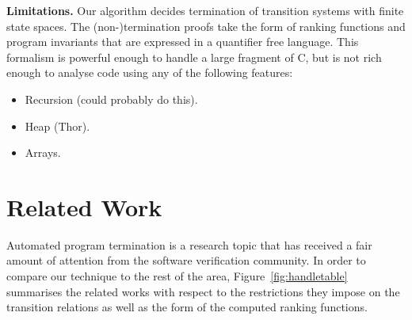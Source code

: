 \documentclass[preprint]{sigplanconf}
\theoremstyle{definition}
\begin{document}





{\bf Limitations.}
Our algorithm decides termination of transition systems with finite state spaces.
The (non-)termination proofs take the form of ranking functions and program invariants
that are expressed in a quantifier free language.  This formalism is powerful
enough to handle a large fragment of C, but is not rich enough to analyse
code using any of the following features:

\begin{itemize}
\item Recursion (could probably do this).
\item Heap (Thor).
\item Arrays.
\end{itemize}

\section{Related Work}
Automated program termination is a research topic that has received a fair amount of attention from the software verification community.
In order to compare our technique to the rest of the area, 
Figure~\ref{fig:handletable} summarises the related works with respect to the restrictions they impose on the transition relations as well as the form of the computed ranking functions. 
\end{document}

